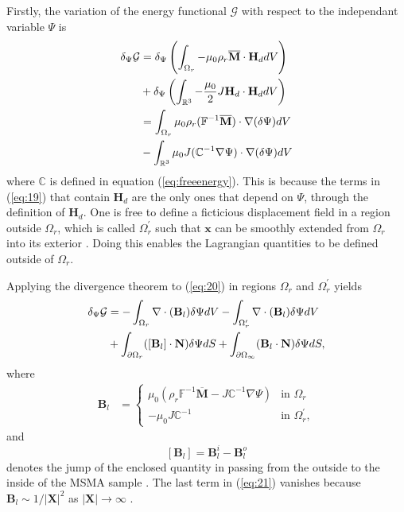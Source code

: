 \begin{multicols}{2}
Firstly, the variation of the energy functional $\mathcal{G}$ with respect to the independant variable $\Psi$ is
\begin{align} \label{eq:20}
    \delta_{\Psi}\mathcal{G} &= \delta_{\Psi}\left(\int_{\Omega_{r}}-\mu_{0}\rho_{r}\overline{\textbf{M}} \cdot \textbf{H}_{d} dV\right) \notag \\
    &+ \delta_{\Psi}\left(\int_{\mathbb{R}^{3}}-\frac{\mu_{0}}{2} J \textbf{H}_{d}\cdot \textbf{H}_{d} dV \right) \notag \\
    &=\int_{\Omega_{r}}\mu_{0}\rho_{r}(\mathbb{F}^{-1}\overline{\textbf{M}})\cdot  \nabla(\delta\Psi) dV \notag \\
    &- \int_{\mathbb{R}^{3}}\mu_{0}J(\mathbb{C}^{-1} \nabla\Psi)\cdot  \nabla(\delta\Psi) dV
\end{align}
where $\mathbb{C}$ is defined in equation (\ref{eq:freeenergy}). This is because the terms in (\ref{eq:19}) that contain $\textbf{H}_{d}$ are the only ones that depend on $\Psi$, through the definition of $\textbf{H}_{d}$. One is free to define a ficticious displacement field in a region outside $\Omega_{r}$, which is called $\Omega_{r}^{\prime}$ such that $\textbf{x}$ can be smoothly extended from $\Omega_{r}$ into its exterior \cite{wang2012variational}. Doing this enables the Lagrangian quantities to be defined outside of $\Omega_{r}$. 

Applying the divergence theorem to (\ref{eq:20}) in regions $\Omega_{r}$ and $\Omega_{r}^{\prime}$ yields
\begin{align} \label{eq:21}
    \delta_{\Psi}\mathcal{G} &= -\int_{\Omega_{r}} \nabla\cdot(\textbf{B}_{l})\delta\Psi dV - \int_{\Omega_{r}^{\prime}} \nabla\cdot(\textbf{B}_{l})\delta\Psi dV \notag \\
    &+ \int_{\partial\Omega_{r}}([\textbf{B}_{l}]\cdot \textbf{N})\delta\Psi dS + \int_{\partial\Omega_{\infty}}(\textbf{B}_{l}\cdot\textbf{N})\delta\Psi dS,
\end{align}
where 
\begin{align} \label{eq:22}
    \textbf{B}_{l} &=
    \begin{cases}
        \mu_{0}(\rho_{r}\mathbb{F}^{-1}\overline{\textbf{M}}-J\mathbb{C}^{-1} \nabla\Psi) & \text{in $\Omega_{r}$}\\
        -\mu_{0}J\mathbb{C}^{-1} & \text{in $\Omega_{r}^{\prime}$},
    \end{cases}
\end{align}
and 
\begin{equation} \label{eq:23}
    [\textbf{B}_{l}] = \textbf{B}_{l}^{i} - \textbf{B}_{l}^{o}
\end{equation}
denotes the jump of the enclosed quantity in passing from the outside to the inside of the MSMA sample \cite{wang2012variational}. The last term in (\ref{eq:21}) vanishes because $\textbf{B}_{l} \sim 1/|\textbf{X}|^{2}$ as $|\textbf{X}|\rightarrow\infty$ \cite{wang2012variational}.


\end{multicols}
